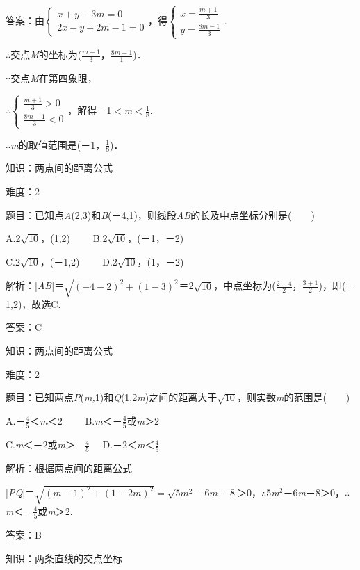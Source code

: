 \documentclass{article} %
\begin{document}
答案：由$\left\{\begin{array}{l} x+y-3m=0\\ 2x-y+2m-1=0 \end{array}\right.$，得$\left\{\begin{array}{l} x=\frac{m+1}{3}\\ y=\frac{8m-1}{3} \end{array}\right.$.

$\mathrm{\therefore}$交点\textit{M}的坐标为($\frac{m+1}{3}$，$\frac{8m-1}{1}$)．

$\mathrm{\because}$交点\textit{M}在第四象限，

$\mathrm{\therefore}\left\{\begin{array}{l} \frac{m+1}{3}>0\\ \frac{8m-1}{3}<0 \end{array}\right.$，解得－1$\mathrm{<}$\textit{m}$\mathrm{<}\frac{1}{8}$.

$\mathrm{\therefore}$\textit{m}的取值范围是(－1，$\frac{1}{8}$)．

知识：两点间的距离公式

难度：2

题目：已知点\textit{A}(2,3)和\textit{B}(－4,1)，则线段\textit{AB}的长及中点坐标分别是(　　)

A.2$\sqrt{10}$，(1,2)　　  B.2$\sqrt{10}$，(－1，－2)

C.2$\sqrt{10}$，(－1,2)　　  D.2$\sqrt{10}$，(1，－2)

解析：|\textit{AB}|＝$\sqrt{(-4-2)^2+(1-3)^2}$＝2$\sqrt{10}$，中点坐标为($\frac{2-4}{2}$，$\frac{3+1}{2}$)，即(－1,2)，故选C.

答案：C

知识：两点间的距离公式

难度：2

题目：已知两点\textit{P}(\textit{m,}1)和\textit{Q}(1,2\textit{m})之间的距离大于$\sqrt{10}$，则实数\textit{m}的范围是(　　)

A.－$\frac{4}{5}$＜\textit{m}＜2　　  B.\textit{m}＜－$\frac{4}{5}$或\textit{m}＞2

C.\textit{m}＜－2或\textit{m}＞　$\frac{4}{5}$　 D.－2＜\textit{m}＜$\frac{4}{5}$

解析：根据两点间的距离公式

|\textit{PQ}|＝$\sqrt{(m-1)^2+(1-2m)^2}=\sqrt{5m^2-6m-8}$＞0，$\mathrm{\therefore}$5\textit{m}${}^{2}$－6\textit{m}－8＞0，$\mathrm{\therefore}$\textit{m}＜－$\frac{4}{5}$或\textit{m}＞2.

答案：B

知识：两条直线的交点坐标
\end{document}
